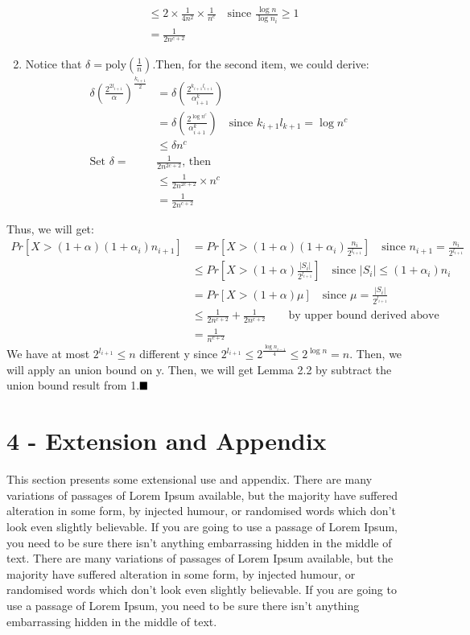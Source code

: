 \documentclass[letterpaper]{article} %
\begin{document}
\begin{enumerate}
\begin{align*}
		& \le 2\times\frac1{4n^2}\times\frac1{n^c}\quad\text{since } \frac{\log n}{\log n_i} \ge 1\\
		& = \frac1{2n^{c+2}}
		\end{align*}
	\item Notice that $\delta=\text{poly}(\frac1n)$.Then, for the second item, we could derive:
		\begin{align*}
		\delta\left( \frac{2^{2l_{i+1}}}{\alpha}\right)^{\frac{k_{i+1}}2} &= \delta\left( \frac{2^{k_{i+1}l_{i+1}}}{\alpha^k_{i+1}}\right)\\
		& =  \delta\left( \frac{2^{\log n^c}}{\alpha^k_{i+1}}\right)\quad\text{since }k_{i+1}l_{k+1} = \log n^c\\
		& \le \delta n^c\\
		\text{Set }\delta = &\frac1{2n^{2c+2}}\text{, then}\\
		& \le \frac1{2n^{2c+2}}\times n^c\\
		& = \frac1{2n^{c+2}}
		\end{align*}
	\end{enumerate}
	Thus, we will get:
	\begin{align*}
	Pr\left[X>(1+\alpha)(1+\alpha_i)n_{i+1}\right] &= Pr\left[X>(1+\alpha)(1+\alpha_i)\frac{n_i}{2^{l_{i+1}}}\right]\quad\text{since }n_{i+1} = \frac{n_i}{2^{l_{i+1}}}\\
	& \le Pr\left[X>(1+\alpha)\frac{|S_i|}{2^{l_{i+1}}}\right]\quad\text{since }|S_i|\le(1+\alpha_i)n_i\\
	& = Pr \left[X>(1+\alpha)\mu\right]\quad\text{since }\mu = \frac{|S_i|}{2^{l_{i+1}}}\\
	& \le \frac1{2n^{c+2}}+\frac1{2n^{c+2}}\qquad \text{by upper bound derived above}\\ 
	& = \frac1{n^{c+2}}
	\end{align*}
	We have at most $2^{l_{i+1}}\le n$ different y since $2^{l_{i+1}}\le2^{\frac{\log n_{i-1}}4}\le 2^{\log n}=n$. Then, we will apply an union bound on y. Then, we will get Lemma 2.2 by subtract the union bound result from 1.$\hfill\blacksquare$ 
	 
	 \section{4 - Extension and Appendix}
	 This section presents some extensional use and appendix. There are many variations of passages of Lorem Ipsum available, but the majority have suffered alteration in some form, by injected humour, or randomised words which don't look even slightly believable. If you are going to use a passage of Lorem Ipsum, you need to be sure there isn't anything embarrassing hidden in the middle of text. There are many variations of passages of Lorem Ipsum available, but the majority have suffered alteration in some form, by injected humour, or randomised words which don't look even slightly believable. If you are going to use a passage of Lorem Ipsum, you need to be sure there isn't anything embarrassing hidden in the middle of text. 
\end{document}
